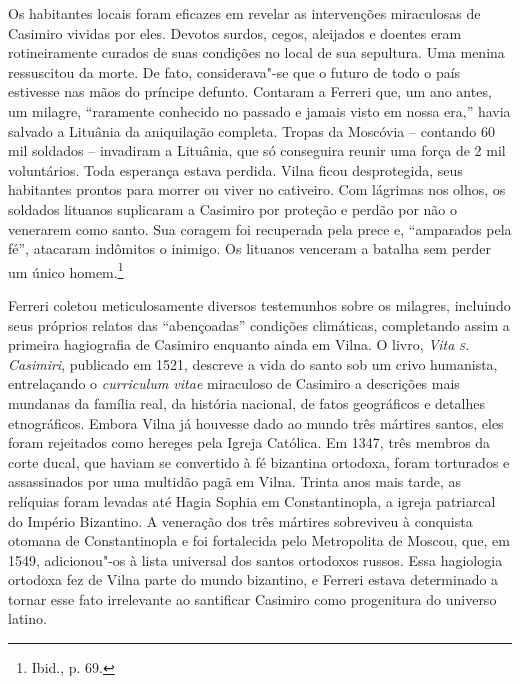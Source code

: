 Os habitantes locais foram eficazes em revelar as intervenções
miraculosas de Casimiro vividas por eles. Devotos surdos, cegos,
aleijados e doentes eram rotineiramente curados de suas condições no
local de sua sepultura. Uma menina ressuscitou da morte. De fato,
considerava"-se que o futuro de todo o país estivesse nas mãos do
príncipe defunto. Contaram a Ferreri que, um ano antes, um milagre,
``raramente conhecido no passado e jamais visto em nossa era,'' havia
salvado a Lituânia da aniquilação completa. Tropas da Moscóvia --
contando 60 mil soldados -- invadiram a Lituânia, que só conseguira
reunir uma força de 2 mil voluntários. Toda esperança estava perdida.
Vilna ficou desprotegida, seus habitantes prontos para morrer ou viver
no cativeiro. Com lágrimas nos olhos, os soldados lituanos suplicaram a
Casimiro por proteção e perdão por não o venerarem como santo. Sua
coragem foi recuperada pela prece e, ``amparados pela fé'', atacaram
indômitos o inimigo. Os lituanos venceram a batalha sem perder um único
homem.\footnote{Ibid., p. 69.}

Ferreri coletou meticulosamente diversos testemunhos sobre os milagres,
incluindo seus próprios relatos das ``abençoadas'' condições climáticas,
completando assim a primeira hagiografia de Casimiro enquanto ainda em
Vilna. O livro, \textit{Vita \textsc{s}.\,Casimiri}, publicado em 1521, descreve a
vida do santo sob um crivo humanista, entrelaçando o \textit{curriculum
vitae} miraculoso de Casimiro a descrições mais mundanas da família
real, da história nacional, de fatos geográficos e detalhes
etnográficos. Embora Vilna já houvesse dado ao mundo três mártires
santos, eles foram rejeitados como hereges pela Igreja Católica. Em
1347, três membros da corte ducal, que haviam se convertido à fé
bizantina ortodoxa, foram torturados e assassinados por uma multidão
pagã em Vilna. Trinta anos mais tarde, as relíquias foram levadas até
Hagia Sophia em Constantinopla, a igreja patriarcal do Império
Bizantino. A veneração dos três mártires sobreviveu à conquista otomana
de Constantinopla e foi fortalecida pelo Metropolita de Moscou, que, em
1549, adicionou"-os à lista universal dos santos ortodoxos russos. Essa
hagiologia ortodoxa fez de Vilna parte do mundo bizantino, e Ferreri
estava determinado a tornar esse fato irrelevante ao santificar Casimiro
como progenitura do universo latino.

